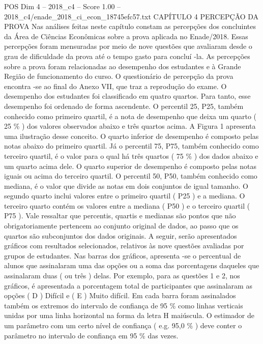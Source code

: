 \begin{textsample}{POS Dim 4 – 2018\_c4 – Score 1.00 – 2018\_c4/enade\_2018\_ci\_econ\_18745efc57.txt}  \label{ex:f4_pos_184}
CAPÍTULO 4 PERCEPÇÃO DA PROVA Nas análises feitas neste capítulo constam as percepções dos concluintes da Área de Ciências Econômicas sobre a prova aplicada no Enade/2018.
Essas percepções foram mensuradas por meio de nove questões que avaliaram desde o grau de dificuldade da prova até o tempo gasto para concluí -la.
As percepções sobre a prova foram relacionadas ao desempenho dos estudantes e à Grande Região de funcionamento do curso.
O questionário de percepção da prova encontra -se ao final do Anexo VII, que traz a reprodução do exame.
O desempenho dos estudantes foi classificado em quatro quartos.
Para tanto, esse desempenho foi ordenado de forma ascendente.
O percentil 25, P25, também conhecido como primeiro quartil, é a nota de desempenho que deixa um quarto ( 25 \% ) dos valores observados abaixo e três quartos acima.
A Figura 1 apresenta uma ilustração desse conceito.
O quarto inferior de desempenho é composto pelas notas abaixo do primeiro quartil.
Já o percentil 75, P75, também conhecido como terceiro quartil, é o valor para o qual há três quartos ( 75 \% ) dos dados abaixo e um quarto acima dele.
O quarto superior de desempenho é composto pelas notas iguais ou acima do terceiro quartil.
O percentil 50, P50, também conhecido como mediana, é o valor que divide as notas em dois conjuntos de igual tamanho.
O segundo quarto inclui valores entre o primeiro quartil ( P25 ) e a mediana.
O terceiro quarto contém os valores entre a mediana ( P50 ) e o terceiro quartil ( P75 ).
Vale ressaltar que percentis, quartis e medianas são pontos que não obrigatoriamente pertencem ao conjunto original de dados, ao passo que os quartos são subconjuntos dos dados originais.
A seguir, serão apresentados gráficos com resultados selecionados, relativos às nove questões avaliadas por grupos de estudantes.
Nas barras dos gráficos, apresenta -se o percentual de alunos que assinalaram uma das opções ou a soma das porcentagens daqueles que assinalaram duas ( ou três ) delas.
Por exemplo, para as questões 1 e 2, nos gráficos, é apresentada a porcentagem total de participantes que assinalaram as opções ( D ) Difícil e ( E ) Muito difícil.
Em cada barra foram assinalados também os extremos do intervalo de confiança de 95 \% como linhas verticais unidas por uma linha horizontal na forma da letra H maiúscula.
O estimador de um parâmetro com um certo nível de confiança ( e.g. 95,0 \% ) deve conter o parâmetro no intervalo de confiança em 95 \% das vezes.

\end{textsample}
